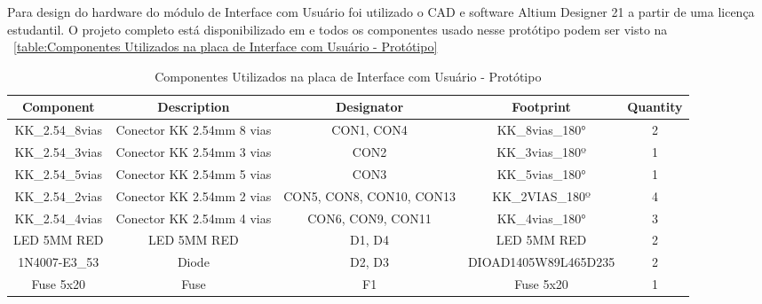 \documentclass[../delivery_hospital_report.tex]{subfiles}
\begin{document}
Para design do hardware do módulo de Interface com Usuário foi utilizado o CAD e software Altium Designer 21 \cite{altium21} a partir de uma licença estudantil. O projeto completo está disponibilizado em \cite{github_modulos} e todos os componentes usado nesse protótipo podem ser visto na ~\ref{table:Componentes Utilizados na placa de Interface com Usuário - Protótipo}

\begin{table}[!ht]
\caption{Componentes Utilizados na placa de Interface com Usuário - Protótipo}
\centering
\begin{adjustbox}{width=\columnwidth,center}
\begin{tabular}{|c|c|c|c|c|}
\hline
Component                   & Description                                    & Designator                             & Footprint                   & Quantity \\ \hline
KK\_2.54\_8vias             & Conector KK 2.54mm 8   vias                    & CON1, CON4                             & KK\_8vias\_180°             & 2        \\ \hline
KK\_2.54\_3vias             & Conector KK 2.54mm 3   vias                    & CON2                                   & KK\_3vias\_180º             & 1        \\ \hline
KK\_2.54\_5vias             & Conector KK 2.54mm 5   vias                    & CON3                                   & KK\_5vias\_180°             & 1        \\ \hline
KK\_2.54\_2vias             & Conector KK 2.54mm 2   vias                    & CON5, CON8, CON10,   CON13             & KK\_2VIAS\_180º             & 4        \\ \hline
KK\_2.54\_4vias             & Conector KK 2.54mm 4   vias                    & CON6, CON9, CON11                      & KK\_4vias\_180°             & 3        \\ \hline
LED 5MM RED                 & LED 5MM RED                                    & D1, D4                                 & LED 5MM RED                 & 2        \\ \hline
1N4007-E3\_53               & Diode                                          & D2, D3                                 & DIOAD1405W89L465D235        & 2        \\ \hline
Fuse 5x20                   & Fuse                                           & F1                                     & Fuse 5x20                   & 1        \\ \hline

\end{tabular}
\end{adjustbox}
\end{table}
\end{document}
